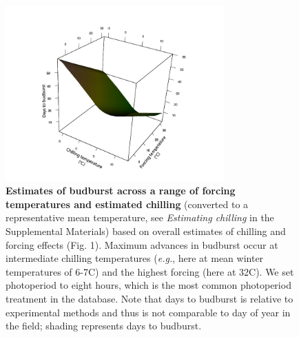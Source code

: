 \documentclass{article}
\begin{document}
\begin{figure}[h!]
\centering
\noindent \includegraphics[width=0.75\textwidth]{..//..//analyses/bb_analysis/figures/bbmod_3dplot_utah_withPEP.png}
\caption{\textbf{Estimates of budburst across a range of forcing temperatures and estimated chilling} (converted to a representative mean temperature, see \emph{Estimating chilling} in the Supplemental Materials) based on overall estimates of chilling and forcing effects (Fig. 1). Maximum advances in budburst occur at intermediate chilling temperatures (\emph{e.g.}, here at mean winter temperatures of 6-7\degree C) and the highest forcing (here at 32\degree C). We set photoperiod to eight hours, which is the most common photoperiod treatment in the database. Note that days to budburst is relative to experimental methods and thus is not comparable to day of year in the field; shading represents days to budburst.} %
\label{fig:apc}
\end{figure}
\newpage
\end{document}
